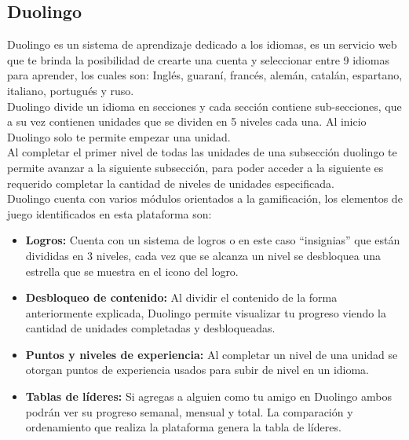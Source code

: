 \begin{multicols*}{2}
\subsection*{Duolingo}

 Duolingo \cite{PagDuolingo} es un sistema de aprendizaje dedicado a los idiomas, es un servicio web que
 te brinda la posibilidad de crearte una cuenta y seleccionar entre 9 idiomas para aprender,
 los cuales son: Inglés, guaraní, francés, alemán, catalán, espartano, italiano, portugués y ruso.\\

 \noindent Duolingo divide un idioma en secciones y cada sección contiene sub-secciones,
 que a su vez contienen unidades que se dividen en 5 niveles cada una. Al inicio Duolingo
 solo te permite empezar una unidad.\\

 \noindent Al completar el primer nivel de todas las unidades de una subsección duolingo
 te permite avanzar a la siguiente subsección, para poder acceder a la siguiente es requerido
 completar la cantidad de niveles de unidades especificada.\\

 \noindent Duolingo cuenta con varios módulos orientados a la gamificación, los elementos
 de juego identificados en esta plataforma son:

    \begin{itemize}
    \item {\bf Logros:} Cuenta con un sistema de logros o en este caso ``insignias''
        que están divididas en 3 niveles, cada vez que se alcanza un nivel se
        desbloquea una estrella que se muestra en el icono del logro.

    \item {\bf Desbloqueo de contenido:} Al dividir el contenido de la forma
        anteriormente explicada, Duolingo permite visualizar tu progreso viendo
        la cantidad de unidades completadas y desbloqueadas.

    \item {\bf Puntos y niveles de experiencia:} Al completar un nivel de una unidad
        se otorgan puntos de experiencia usados para subir de nivel en un idioma.

    \item {\bf Tablas de líderes:} Si agregas a alguien como tu amigo en Duolingo ambos
        podrán ver su progreso semanal, mensual y total. La comparación y ordenamiento
        que realiza la plataforma genera la tabla de líderes.


\end{itemize}
\end{multicols*}
